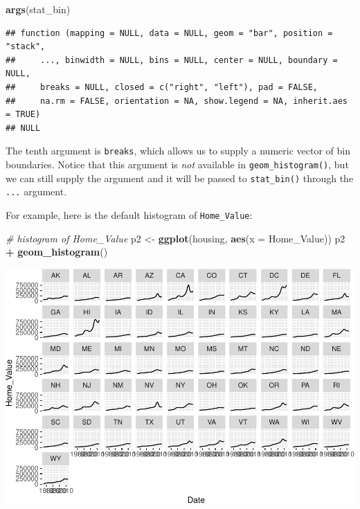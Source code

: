 \documentclass[
]{book}
\newenvironment{Shaded}{\begin{snugshade}}{\end{snugshade}}
\newcommand{\CommentTok}[1]{\textcolor[rgb]{0.56,0.35,0.01}{\textit{#1}}}
\newcommand{\DataTypeTok}[1]{\textcolor[rgb]{0.13,0.29,0.53}{#1}}
\newcommand{\KeywordTok}[1]{\textcolor[rgb]{0.13,0.29,0.53}{\textbf{#1}}}
\newcommand{\NormalTok}[1]{#1}
\newcommand{\OperatorTok}[1]{\textcolor[rgb]{0.81,0.36,0.00}{\textbf{#1}}}
\newcommand{\StringTok}[1]{\textcolor[rgb]{0.31,0.60,0.02}{#1}}
\begin{document}
\begin{Shaded}
\begin{Highlighting}[]
\KeywordTok{args}\NormalTok{(stat\_bin)}
\end{Highlighting}
\end{Shaded}

\begin{verbatim}
## function (mapping = NULL, data = NULL, geom = "bar", position = "stack", 
##     ..., binwidth = NULL, bins = NULL, center = NULL, boundary = NULL, 
##     breaks = NULL, closed = c("right", "left"), pad = FALSE, 
##     na.rm = FALSE, orientation = NA, show.legend = NA, inherit.aes = TRUE) 
## NULL
\end{verbatim}

The tenth argument is \texttt{breaks}, which allows us to supply a numeric vector of bin boundaries. Notice that this argument is \emph{not} available in \texttt{geom\_histogram()}, but we can still supply the argument and it will be passed to \texttt{stat\_bin()} through the \texttt{...} argument.

For example, here is the default histogram of \texttt{Home\_Value}:

\begin{Shaded}
\begin{Highlighting}[]
\CommentTok{\# histogram of \textasciigrave{}Home\_Value\textasciigrave{}}
\NormalTok{p2 \textless{}{-}}\StringTok{ }\KeywordTok{ggplot}\NormalTok{(housing, }\KeywordTok{aes}\NormalTok{(}\DataTypeTok{x =}\NormalTok{ Home\_Value))}
\NormalTok{p2 }\OperatorTok{+}\StringTok{ }\KeywordTok{geom\_histogram}\NormalTok{()}
\end{Highlighting}
\end{Shaded}

\includegraphics{R/Rgraphics/figures/unnamed-chunk-181-1.pdf}
\end{document}
